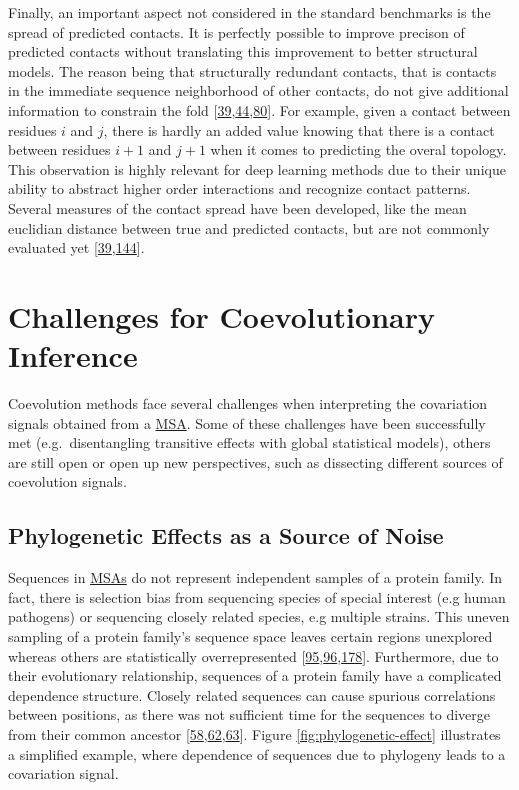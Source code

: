 \documentclass[11pt,a4paper,twoside]{book}
\theoremstyle{definition}
\theoremstyle{definition}
\theoremstyle{remark}
\begin{document}
Finally, an important aspect not considered in the standard benchmarks
is the spread of predicted contacts. It is perfectly possible to improve
precison of predicted contacts without translating this improvement to
better structural models. The reason being that structurally redundant
contacts, that is contacts in the immediate sequence neighborhood of
other contacts, do not give additional information to constrain the fold
{[}\protect\hyperlink{ref-Marks2011}{39},\protect\hyperlink{ref-Kim2014}{44},\protect\hyperlink{ref-Jones2015}{80}{]}.
For example, given a contact between residues \(i\) and \(j\), there is
hardly an added value knowing that there is a contact between residues
\(i\!+\!1\) and \(j\!+\!1\) when it comes to predicting the overal
topology. This observation is highly relevant for deep learning methods
due to their unique ability to abstract higher order interactions and
recognize contact patterns. Several measures of the contact spread have
been developed, like the mean euclidian distance between true and
predicted contacts, but are not commonly evaluated yet
{[}\protect\hyperlink{ref-Marks2011}{39},\protect\hyperlink{ref-DeOliveira2016}{144}{]}.

\section{Challenges for Coevolutionary Inference}\label{challenges}

Coevolution methods face several challenges when interpreting the
covariation signals obtained from a \protect\hyperlink{abbrev}{MSA}.
Some of these challenges have been successfully met (e.g.~disentangling
transitive effects with global statistical models), others are still
open or open up new perspectives, such as dissecting different sources
of coevolution signals.

\subsection{Phylogenetic Effects as a Source of
Noise}\label{phylogenetic-noise}

Sequences in \protect\hyperlink{abbrev}{MSAs} do not represent
independent samples of a protein family. In fact, there is selection
bias from sequencing species of special interest (e.g human pathogens)
or sequencing closely related species, e.g multiple strains. This uneven
sampling of a protein family's sequence space leaves certain regions
unexplored whereas others are statistically overrepresented
{[}\protect\hyperlink{ref-Morcos2011}{95},\protect\hyperlink{ref-Cocco2017}{96},\protect\hyperlink{ref-Marks2012}{178}{]}.
Furthermore, due to their evolutionary relationship, sequences of a
protein family have a complicated dependence structure. Closely related
sequences can cause spurious correlations between positions, as there
was not sufficient time for the sequences to diverge from their common
ancestor
{[}\protect\hyperlink{ref-Gouveia_Oliveira2007}{58},\protect\hyperlink{ref-Lapedes1999}{62},\protect\hyperlink{ref-Burger2010}{63}{]}.
Figure \ref{fig:phylogenetic-effect} illustrates a simplified example,
where dependence of sequences due to phylogeny leads to a covariation
signal.
\end{document}
